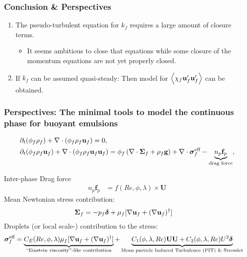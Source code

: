\documentclass{sintefbeamer}
\begin{document}
\begin{frame}
  \frametitle{Conclusion \& Perspectives}

  \begin{enumerate}
    \item The pseudo-turbulent equation for $k_f$ requires a large amount of closure terms. 
    \begin{itemize}
      \item 
      It seems ambitious to close that equations while some closure of the momentum equations are not yet properly closed. 
    \end{itemize}
    \item If $k_f$ can be assumed quasi-steady: Then model for $\left<\chi_f\textbf{u}_f'\textbf{u}_f'\right>$ can be obtained. 
  \end{enumerate}

\end{frame}

\begin{frame}
  \frametitle{Perspectives: The minimal tools to model the continuous phase for buoyant emulsions}


  \begin{align*}
    &\partial_t (\phi_f \rho_f)  
    + \mathbf{\nabla}\cdot (
        \phi_f \rho_f\textbf{u}_f
    )
    = 
    0,\\
    &\partial_t (\phi_f\rho_f \textbf{u}_f)
    + \mathbf{\nabla}\cdot (\phi_f\rho_f \textbf{u}_f\textbf{u}_f)
    = \phi_f 
    \left(\mathbf{\nabla}\cdot \bm{\Sigma}_f
    + \rho_f \textbf{g}\right)
    + \mathbf{\nabla}\cdot  \bm{\sigma}_f^{\text{eff}}
    - \underbrace{n_p \textbf{f}_p}_\text{drag force},
  \end{align*}
  \pause
  
Inter-phase Drag force 
  \begin{align*}
    n_p \textbf{f}_p  
    &= 
    f(Re,\phi, \lambda) \times \textbf{U}
  \end{align*}
Mean Newtonian stress contribution: 
\begin{align*}
  \bm\Sigma_f &= - p_f \bm\delta + \mu_f [\mathbf{\nabla} \textbf{u}_f +  (\mathbf{\nabla} \textbf{u}_f)^\dagger ] 
\end{align*}
Droplets  (or local scale-)  contribution to the stress:
\begin{align*}
    \bm{\sigma}^{\text{eff}}_f 
    &= \underbrace{C_E(Re,\phi,\lambda) \mu_f [\mathbf{\nabla} \textbf{u}_f +  (\mathbf{\nabla} \textbf{u}_f)^\dagger ] }_\text{``Einstein viscosity''-like contribution}
    + 
    \underbrace{
      C_1(\phi,\lambda,Re)\textbf{UU}
    + C_2(\phi,\lambda,Re)U^2 \bm\delta}_\text{Mean particle Induced Turbulence (PIT) \& Stresslet}
\end{align*}

\end{frame}
\backmatter
\end{document}
